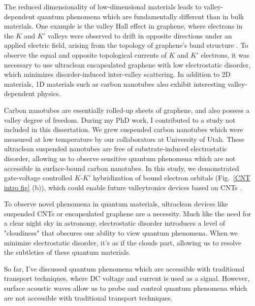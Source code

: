 \documentclass{beavtex_dub_edit}
\begin{document}
The reduced dimensionality of low-dimensional materials leads to valley-dependent quantum phenomena which are fundamentally different than in bulk materials. One example is the valley Hall effect in graphene, where electrons in the $K$ and $K'$ valleys were observed to drift in opposite directions under an applied electric field, arising from the topology of graphene's band structure \cite{gorbachev_detecting_2014}. To observe the equal and opposite topological currents of $K$ and $K'$ electrons, it was necessary to use ultraclean encapsulated graphene with low electrostatic disorder, which minimizes disorder-induced inter-valley scattering. In addition to 2D materials, 1D materials such as carbon nanotubes also exhibit interesting valley-dependent physics. 

Carbon nanotubes are essentially rolled-up sheets of graphene, and also possess a valley degree of freedom. During my PhD work, I contributed to a study not included in this dissertation. We grew suspended carbon nanotubes which were measured at low temperature by our collaborators at University of Utah. These ultraclean suspended nanotubes are free of substrate-induced electrostatic disorder, allowing us to observe sensitive quantum phenomena which are not accessible in surface-bound carbon nanotubes. In this study, we demonstrated gate-voltage controlled $K$-$K'$ hybridization of bound electron orbitals (Fig.\ \ref{CNT intro fig} (b)), which could enable future valleytronics devices based on CNTs \cite{berg_vernier_2024}. 

To observe novel phenomena in quantum materials, ultraclean devices like suspended CNTs or encapsulated graphene are a necessity. Much like the need for a clear night sky in astronomy, electrostatic disorder introduces a level of "cloudiness" that obscures our ability to view quantum phenomena. When we minimize electrostatic disorder, it’s as if the clouds part, allowing us to resolve the subtleties of these quantum materials. 

So far, I've discussed quantum phenomena which are accessible with traditional transport techniques, where DC voltage and current is used as a signal. However, surface acoustic waves allow us to probe and control quantum phenomena which are not accessible with traditional transport techniques. 
\end{document}
